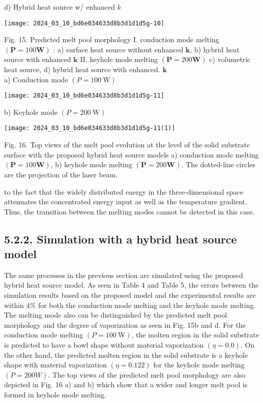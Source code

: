 \documentclass[10pt]{article}
\begin{document}
d) Hybrid heat source w/ enhanced $k$

\begin{center}
\texttt{[image: 2024\_03\_10\_bd6e034633d8b3d1d1d5g-10]}
\end{center}

Fig. 15. Predicted melt pool morphology I. conduction mode melting $(\boldsymbol{P}=100 \mathbf{W})$ : a) surface heat source without enhanced $\boldsymbol{k}$, b) hybrid heat source with enhanced $\boldsymbol{k}$ II. keyhole mode melting $(\boldsymbol{P}=200 \mathbf{W})$ c) volumetric heat source, d) hybrid heat source with enhanced. $\boldsymbol{k}$\\
a) Conduction mode $(P=100 \mathrm{~W})$

\begin{center}
\texttt{[image: 2024\_03\_10\_bd6e034633d8b3d1d1d5g-11]}
\end{center}

b) Keyhole mode $(P=200 \mathrm{~W})$

\begin{center}
\texttt{[image: 2024\_03\_10\_bd6e034633d8b3d1d1d5g-11(1)]}
\end{center}

Fig. 16. Top views of the melt pool evolution at the level of the solid substrate surface with the proposed hybrid heat source models a) conduction mode melting $(\boldsymbol{P}=100 \mathbf{W})$, b) keyhole mode melting $(\boldsymbol{P}=200 \mathbf{W})$. The dotted-line circles are the projection of the laser beam.

to the fact that the widely distributed energy in the three-dimensional space attenuates the concentrated energy input as well as the temperature gradient. Thus, the transition between the melting modes cannot be detected in this case.

\subsection*{5.2.2. Simulation with a hybrid heat source model}
The same processes in the previous section are simulated using the proposed hybrid heat source model. As seen in Table 4 and Table 5, the errors between the simulation results based on the proposed model and the experimental results are within $4 \%$ for both the conduction mode melting and the keyhole mode melting. The melting mode also can be distinguished by the predicted melt pool morphology and the degree of vaporization as seen in Fig. 15b and d. For the conduction mode melting $(P=100 \mathrm{~W})$, the molten region in the solid substrate is predicted to have a bowl shape without material vaporization $(\eta=0.0)$. On the other hand, the predicted molten region in the solid substrate is a keyhole shape with material vaporization $(\eta=0.122)$ for the keyhole mode melting $(P=200 W)$. The top views of the predicted melt pool morphology are also depicted in Fig. 16 a) and b) which show that a wider and longer melt pool is formed in keyhole mode melting.
\end{document}
